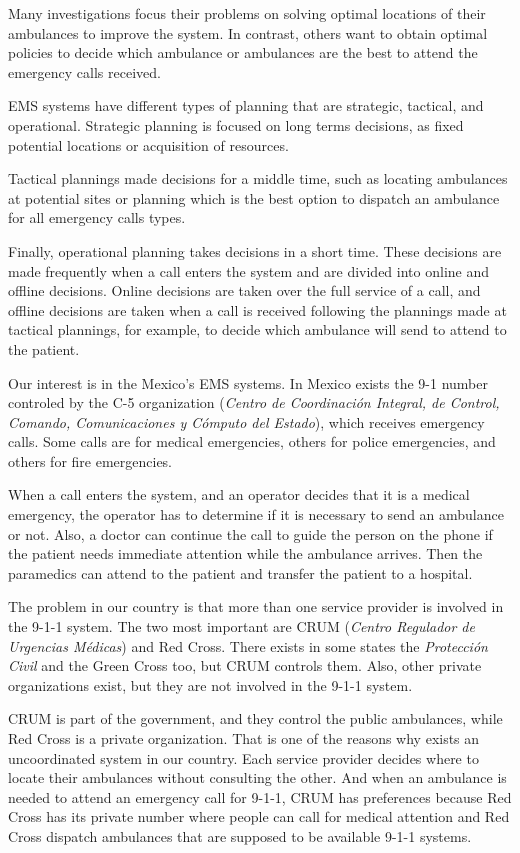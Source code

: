 Many investigations focus their problems on solving optimal locations of their ambulances to improve the system. In contrast, others want to obtain optimal policies to decide which ambulance or ambulances are the best to attend the e\-mer\-gen\-cy calls received.

EMS systems have different types of planning that are strategic, tactical, and operational. Strategic planning is focused on long terms decisions, as fixed potential locations or acquisition of resources.

Tactical plannings made decisions for a middle time, such as locating am\-bu\-lan\-ces at potential sites or planning which is the best option to dispatch an ambulance for all emergency calls types. 

Finally, operational planning takes decisions in a short time. These decisions are made frequently when a call enters the system and are divided into online and offline decisions. Online decisions are taken over the full service of a call, and offline decisions are taken when a call is received following the plannings made at tactical plannings, for example, to decide which ambulance will send to attend to the patient.

Our interest is in the Mexico's EMS systems. In Mexico exists the {9-1} number controled by the C-5 organization (\textit{Centro de Coordinación Integral, de Control, Comando, Comunicaciones y Cómputo del Estado}), which receives e\-mer\-gen\-cy calls. Some calls are for medical emergencies, others for police emergencies, and others for fire emergencies. 

When a call enters the system, and an operator decides that it is a medical emergency, the operator has to determine if it is necessary to send an ambulance or not. Also, a doctor can continue the call to guide the person on the phone if the patient needs immediate attention while the ambulance arrives. Then the paramedics can attend to the patient and transfer the patient to a hospital.

The problem in our country is that more than one service provider is involved in the 9-1-1 system. The two most important are CRUM (\textit{Centro Regulador de Urgencias Médicas}) and Red Cross. There exists in some states the \textit{Protección Civil} and the Green Cross too, but CRUM controls them. Also, other private organizations exist, but they are not involved in the 9-1-1 system.

CRUM is part of the government, and they control the public ambulances, while Red Cross is a private organization. That is one of the reasons why exists an uncoordinated system in our country. Each service provider decides where to locate their ambulances without consulting the other. And when an ambulance is needed to attend an emergency call for 9-1-1, CRUM has preferences because Red Cross has its private number where people can call for medical attention and Red Cross dispatch ambulances that are supposed to be available 9-1-1 systems.

